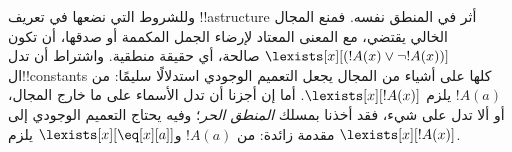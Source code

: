 \documentclass[../../../include/open-logic-section]{subfiles}
\begin{document}
\begin{digress}
وللشروط التي نضعها في تعريف !!a{structure} أثر في المنطق نفسه.
فمنع المجال الخالي يقتضي، مع المعنى المعتاد لإرضاء الجمل المكممة
أو صدقها، أن تكون
$\lexists[x][(!A(x) \lor \lnot !A(x))]$ صالحة، أي حقيقة منطقية.
واشتراط أن تدل ال!!{constant}s كلها على أشياء من المجال يجعل
التعميم الوجودي استدلالًا سليمًا: من $!A(a)$ يلزم
$\lexists[x][!A(x)]$. أما إن أجزنا أن تدل الأسماء على ما خارج المجال،
أو ألا تدل على شيء، فقد أخذنا بمسلك \emph{المنطق الحر}؛
وفيه يحتاج التعميم الوجودي إلى مقدمة زائدة: من $!A(a)$
و$\lexists[x][\eq[x][a]]$ يلزم
$\lexists[x][!A(x)]$.
\end{digress}
\end{document}
